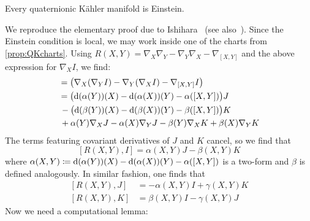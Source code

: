 \begin{thm}
	Every quaternionic K\"ahler manifold is Einstein.
\end{thm}
\begin{myproof}
	We reproduce the elementary proof due to Ishihara~\cite{Ish1974} (see also~\cite{Bes2008}). Since the Einstein condition is local, we may work inside one of the charts from \cref{prop:QKcharts}. Using $R(X,Y)=\nabla_X\nabla_Y-\nabla_Y\nabla_X-\nabla_{[X,Y]}$ and the above expression for $\nabla_X I$, we find:
	\begin{align*}
		[R(X,Y),I]
		&=\big(\nabla_X(\nabla_Y I)-\nabla_Y(\nabla_X I)-\nabla_{[X,Y]}I\big)\\
		&=\big(\d(\alpha(Y))(X)-\d(\alpha(X))(Y)-\alpha([X,Y])\big)J\\
		&\,-\big(\d(\beta(Y))(X)-\d(\beta(X))(Y)-\beta([X,Y])\big)K\\
		&\,+\alpha(Y)\nabla_X J-\alpha(X)\nabla_Y J
		-\beta(Y)\nabla_X K+\beta(X)\nabla_Y K
	\end{align*}
	The terms featuring covariant derivatives of $J$ and $K$ cancel, so we find that 
	\begin{equation}\label{eq:Icurvcommutator}
		[R(X,Y),I]=\alpha(X,Y)J-\beta(X,Y)K
	\end{equation}
	where $\alpha(X,Y)\coloneqq \mathrm{d}(\alpha(Y))(X)-\mathrm{d}(\alpha(X))(Y)-\alpha([X,Y])$ is a two-form and $\beta$ is defined analogously. In similar fashion, one finds that
	\begin{align}\label{eq:Jcurvcommutator}
		[R(X,Y),J]&=-\alpha(X,Y) I+\gamma(X,Y) K\\\label{eq:Kcurvcommutator}
		[R(X,Y),K]&=\beta(X,Y) I-\gamma(X,Y) J
	\end{align}
	Now we need a computational lemma: 
	

\end{myproof}
